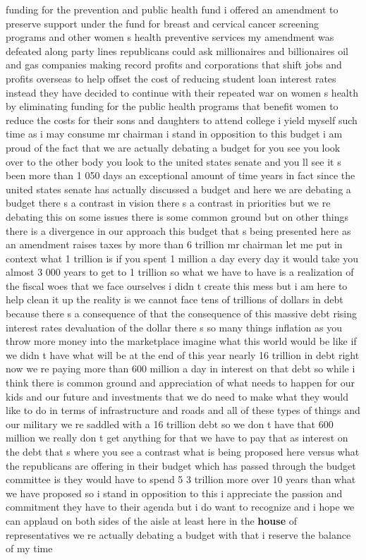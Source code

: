 \documentclass{article}
\begin{document}
funding for the prevention and public health fund i offered an amendment to preserve support under the fund for breast and cervical cancer screening programs and other women s health preventive services my amendment was defeated along party lines republicans could ask millionaires and billionaires oil and gas companies making record profits and corporations that shift jobs and profits overseas to help offset the cost of reducing student loan interest rates instead they have decided to continue with their repeated war on women s health by eliminating funding for the public health programs that benefit women to reduce the costs for their sons and daughters to attend college
\vspace{8mm}
i yield myself such time as i may consume mr chairman i stand in opposition to this budget i am proud of the fact that we are actually debating a budget for you see you look over to the other body you look to the united states senate and you ll see it s been more than 1 050 days an exceptional amount of time years in fact since the united states senate has actually discussed a budget and here we are debating a budget there s a contrast in vision there s a contrast in priorities but we re debating this on some issues there is some common ground but on other things there is a divergence in our approach this budget that s being presented here as an amendment raises taxes by more than 6 trillion mr chairman let me put in context what 1 trillion is if you spent 1 million a day every day it would take you almost 3 000 years to get to 1 trillion so what we have to have is a realization of the fiscal woes that we face ourselves i didn t create this mess but i am here to help clean it up the reality is we cannot face tens of trillions of dollars in debt because there s a consequence of that the consequence of this massive debt rising interest rates devaluation of the dollar there s so many things inflation as you throw more money into the marketplace imagine what this world would be like if we didn t have what will be at the end of this year nearly 16 trillion in debt right now we re paying more than 600 million a day in interest on that debt so while i think there is common ground and appreciation of what needs to happen for our kids and our future and investments that we do need to make what they would like to do in terms of infrastructure and roads and all of these types of things and our military we re saddled with a 16 trillion debt so we don t have that 600 million we really don t get anything for that we have to pay that as interest on the debt that s where you see a contrast what is being proposed here versus what the republicans are offering in their budget which has passed through the budget committee is they would have to spend 5 3 trillion more over 10 years than what we have proposed so i stand in opposition to this i appreciate the passion and commitment they have to their agenda but i do want to recognize and i hope we can applaud on both sides of the aisle at least here in the {\bf \color{red} house} of representatives we re actually debating a budget with that i reserve the balance of my time\pagebreak
\end{document}
